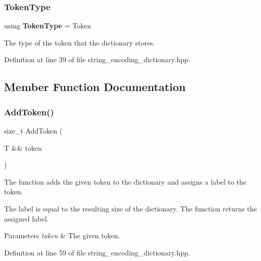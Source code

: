 \subsubsection{Token\+Type}
{\footnotesize\ttfamily using \textbf{ Token\+Type} =  Token}



The type of the token that the dictionary stores. 



Definition at line 39 of file string\+\_\+encoding\+\_\+dictionary.\+hpp.



\subsection{Member Function Documentation}
\mbox{\label{classmlpack_1_1data_1_1StringEncodingDictionary_ae8074a56f3029cc0b3060b40292bedb8}} 
\subsubsection{Add\+Token()}
{\footnotesize\ttfamily size\+\_\+t Add\+Token (\begin{DoxyParamCaption}\item[{T \&\&}]{token }\end{DoxyParamCaption})\hspace{0.3cm}{\ttfamily [inline]}}



The function adds the given token to the dictionary and assigns a label to the token. 

The label is equal to the resulting size of the dictionary. The function returns the assigned label.


\begin{DoxyParams}{Parameters}
{\em token} & The given token. \\
\hline
\end{DoxyParams}


Definition at line 59 of file string\+\_\+encoding\+\_\+dictionary.\+hpp.

\mbox{\label{classmlpack_1_1data_1_1StringEncodingDictionary_aa71d36872f416feaa853788a7a7a7ef8}} 
